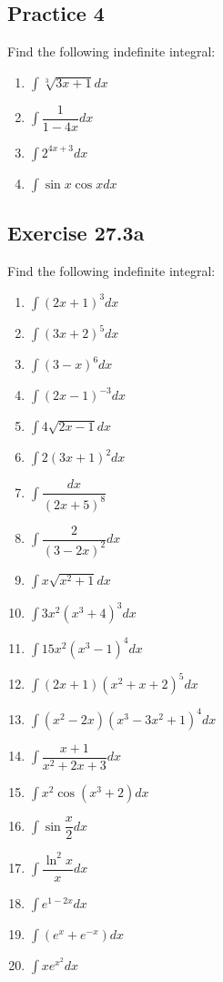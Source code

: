 \documentclass{report}
\begin{document}
\subsection{Practice 4}
Find the following indefinite integral:
\begin{enumerate}
    \item $\displaystyle\int{\sqrt[3]{3x+1}}dx$
    \item $\displaystyle\int\dfrac{1}{1-4x}dx$
    \item $\displaystyle\int2^{4x+3}dx$
    \item $\displaystyle\int\sin x\cos xdx$
\end{enumerate}

\subsection{Exercise 27.3a}
Find the following indefinite integral:
\begin{enumerate}
    \item $\displaystyle\int(2x+1)^{3} dx$
    \item $\displaystyle\int(3x+2)^{5} dx$
    \item $\displaystyle\int(3-x)^{6} dx$
    \item $\displaystyle\int(2x-1)^{-3} dx$
    \item $\displaystyle\int4{\sqrt{2x-1}} dx$
    \item $\displaystyle\int2(3x+1)^{2} dx$
    \item $\displaystyle\int\dfrac{dx}{(2x+5)^{8}}$
    \item $\displaystyle\int\dfrac{2}{(3-2x)^{2}} dx$
    \item $\displaystyle\int x{\sqrt{x^{2}+1}} dx$
    \item $\displaystyle\int 3x^{2}\left(x^{3}+4\right)^{3} dx$
    \item $\displaystyle\int15x^{2}\left(x^{3}-1\right)^{4} dx$
    \item $\displaystyle\int\left(2x+1\right)\!\left(x^{2}+x\!+\!2\right)^{5} dx$
    \item $\displaystyle\int\left(x^{2}-2x\right)\left(x^{3}-3x^{2}+1\right)^{4} dx$
    \item $\displaystyle\int\dfrac{x+1}{{{x}^{2}}+2x+3} dx$
    \item $\displaystyle\int x^{2}\cos\left(x^{3}+2\right) dx$
    \item $\displaystyle\int\sin{\dfrac{x}{2}} dx$
    \item $\displaystyle\int\dfrac{\ln^2 x}{x} dx$
    \item $\displaystyle\int e^{1 - 2x} dx$
    \item $\displaystyle\int\left(e^{x}+e^{-x}\right) dx$
    \item $\displaystyle\int x e^{x^2} dx$
\end{enumerate}
\end{document}
